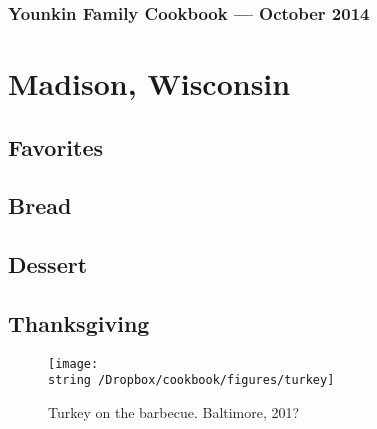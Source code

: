 \documentclass[12pt, final]{book}
\begin{document}
\frontmatter

\cleardoublepage
\section*{Younkin Family Cookbook --- October 2014}

\tableofcontents
\mainmatter
\part{Madison, Wisconsin}
\chapter{Favorites}\label{favorites}

\newpage

\newpage
\chapter{Bread}\label{bread}

\newpage

\newpage

\newpage
\chapter{Dessert}\label{dessert}

\newpage

\newpage

\newpage

\clearpage
\chapter{Thanksgiving}\label{chapter2}
\begin{figure}[h]
\begin{center}
\texttt{[image: \\string~/Dropbox/cookbook/figures/turkey]}
\end{center}
\caption*{Turkey on the barbecue. Baltimore, 201?}
\end{figure}
\newpage


\newpage

\newpage

\newpage

\newpage

\newpage

\newpage

\newpage
\end{document}
